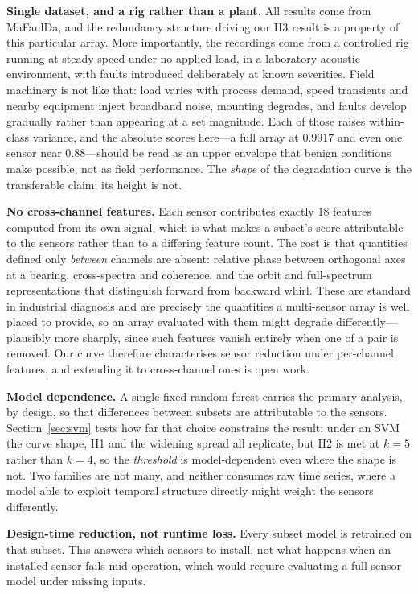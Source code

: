 \documentclass[conference]{IEEEtran}
\begin{document}
\textbf{Single dataset, and a rig rather than a plant.} All results come from
MaFaulDa, and the redundancy structure driving our H3 result is a property of
this particular array. More importantly, the recordings come from a controlled
rig running at steady speed under no applied load, in a laboratory acoustic
environment, with faults introduced deliberately at known severities. Field
machinery is not like that: load varies with process demand, speed transients
and nearby equipment inject broadband noise, mounting degrades, and faults
develop gradually rather than appearing at a set magnitude. Each of those
raises within-class variance, and the absolute scores here---a full array at
$0.9917$ and even one sensor near $0.88$---should be read as an upper envelope
that benign conditions make possible, not as field performance. The
\emph{shape} of the degradation curve is the transferable claim; its height is
not.

\textbf{No cross-channel features.} Each sensor contributes exactly 18
features computed from its own signal, which is what makes a subset's score
attributable to the sensors rather than to a differing feature count. The cost
is that quantities defined only \emph{between} channels are absent: relative
phase between orthogonal axes at a bearing, cross-spectra and coherence, and
the orbit and full-spectrum representations that distinguish forward from
backward whirl. These are standard in industrial diagnosis and are precisely
the quantities a multi-sensor array is well placed to provide, so an array
evaluated with them might degrade differently---plausibly more sharply, since
such features vanish entirely when one of a pair is removed. Our curve
therefore characterises sensor reduction under per-channel features, and
extending it to cross-channel ones is open work.

\textbf{Model dependence.} A single fixed random forest carries the primary
analysis, by design, so that differences between subsets are attributable to
the sensors. Section~\ref{sec:svm} tests how far that choice constrains the
result: under an SVM the curve shape, H1 and the widening spread all replicate,
but H2 is met at $k=5$ rather than $k=4$, so the \emph{threshold} is
model-dependent even where the shape is not. Two families are not many, and
neither consumes raw time series, where a model able to exploit temporal
structure directly might weight the sensors differently.

\textbf{Design-time reduction, not runtime loss.} Every subset model is
retrained on that subset. This answers which sensors to install, not what
happens when an installed sensor fails mid-operation, which would require
evaluating a full-sensor model under missing inputs.
\end{document}
